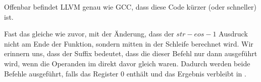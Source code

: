 Offenbar befindet LLVM genau wie GCC, dass diese Code kürzer (oder schneller)
ist.

\mysubparagraph{\OptimizingKeilVI (\ARMMode)}




Fast das gleiche wie zuvor, mit der Änderung, dass der $str - eos - 1$
Ausdruck nicht am Ende der Funktion, sondern mitten in der Schleife berechnet
wird. Wir erinnern uns, dass der  Suffix bedeutet, dass die dieser
Befehl nur dann ausgeführt wird, wenn die Operanden im \CMP direkt davor gleich
waren.
Dadurch werden beide  Befehle ausgeführt, falls das  Register 0
enthält und das Ergebnis verbleibt in .
